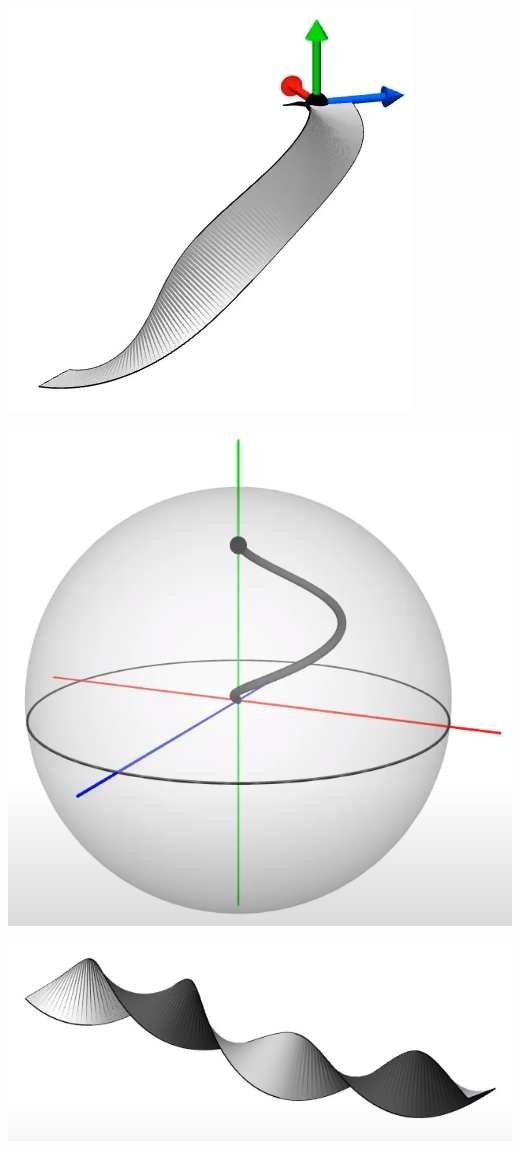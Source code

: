 \documentclass[10pt]{beamer}
\begin{document}
    \includegraphics[scale=0.1]{Pictures/noncontractiblepathbelt.png}

    \includegraphics[scale=0.1]{Pictures/noncontractiblepathsphere.png}

    \includegraphics[scale=0.1]{Pictures/4pibelt.png}
\end{document}
